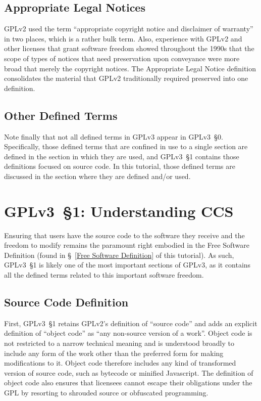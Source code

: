 \subsection{Appropriate Legal Notices}

GPLv2 used the term ``appropriate copyright notice and disclaimer of
warranty'' in two places, which is a rather bulk term.  Also, experience with
GPLv2 and other licenses that grant software freedom showed throughout the
1990s that the scope of types of notices that need preservation upon
conveyance were more broad that merely the copyright notices.  The
Appropriate Legal Notice definition consolidates the material that GPLv2
traditionally required preserved into one definition.

\subsection{Other Defined Terms}

Note finally that not all defined terms in GPLv3 appear in GPLv3~\S0.
Specifically, those defined terms that are confined in use to a single
section are defined in the section in which they are used, and GPLv3~\S1
contains those definitions focused on source code.  In this tutorial, those
defined terms are discussed in the section where they are defined and/or
used.

\section{GPLv3~\S1: Understanding CCS}
\label{GPLv3s1}

Ensuring that users have the source code to the software they receive and the
freedom to modify remains the paramount right embodied in the Free Software
Definition (found in \S~\ref{Free Software Definition} of this tutorial).  As
such, GPLv3~\S1 is likely one of the most important sections of GPLv3, as it
contains all the defined terms related to this important software freedom.

\subsection{Source Code Definition}

First, GPLv3~\S1 retains GPLv2's definition of ``source code'' and adds an
explicit definition of ``object code'' as ``any non-source version of a
work''.  Object code is not restricted to a narrow technical meaning and is
understood broadly to include any form of the work other than the preferred
form for making modifications to it.  Object code therefore includes any kind
of transformed version of source code, such as bytecode or minified
Javascript.  The definition of object code also ensures that licensees cannot
escape their obligations under the GPL by resorting to shrouded source or
obfuscated programming.

